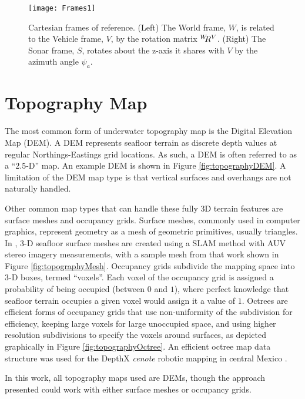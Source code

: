 \begin{figure}[!h]
	\centering
		\texttt{[image: Frames1]}
	\caption{Cartesian frames of reference. (Left) The World frame, $W$, is related to the Vehicle frame, $V$, by the rotation matrix $^{W}\hspace{-0.8ex}R^{V}$. (Right) The Sonar frame, $S$, rotates about the z-axis it shares with $V$ by the azimuth angle $\psi_a$.}
	\label{fig:frames}
\end{figure}

\section{Topography Map}
\label{framework.Topography}

The most common form of underwater topography map is the Digital Elevation Map (DEM).  A DEM represents seafloor terrain as discrete depth values at regular Northings-Eastings grid locations.  
As such, a DEM is often referred to as a ``2.5-D'' map.  
An example DEM is shown in Figure \ref{fig:topographyDEM}.
A limitation of the DEM map type is that vertical surfaces and overhangs are not naturally handled. 

Other common map types that can handle these fully 3D terrain features are surface meshes and occupancy grids. 
Surface meshes, commonly used in computer graphics, represent geometry as a mesh of geometric primitives, usually triangles. 
In \cite{JohnsonRoberson2010}, 3-D seafloor surface meshes are created using a SLAM method with AUV stereo imagery measurements, with a sample mesh from that work shown in Figure \ref{fig:topographyMesh}.
Occupancy grids subdivide the mapping space into 3-D boxes, termed ``voxels''.  
Each voxel of the occupancy grid is assigned a probability of being occupied (between $0$ and $1$), where perfect knowledge that seafloor terrain occupies a given voxel would assign it a value of $1$.
Octrees are efficient forms of occupancy grids that use non-uniformity of the subdivision for efficiency, keeping large voxels for large unoccupied space, and using higher resolution subdivisions to specify the voxels around surfaces, as depicted graphically in Figure \ref{fig:topographyOctree}.
An efficient octree map data structure was used for the DepthX \emph{cenote} robotic mapping in central Mexico \cite{Fairfield2007}.

In this work, all topography maps used are DEMs, though the approach presented could work with either surface meshes or occupancy grids.

